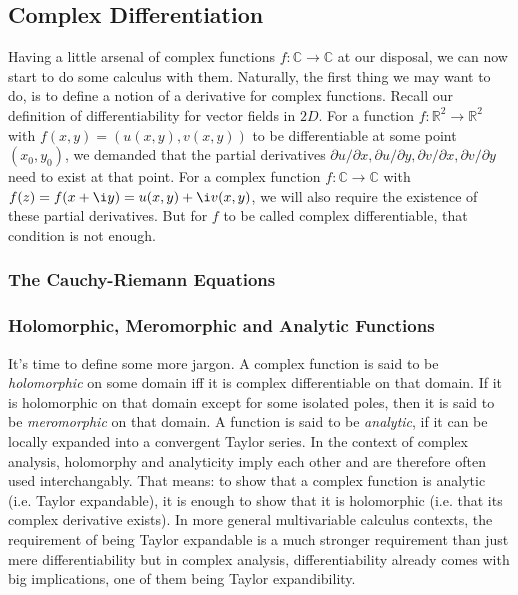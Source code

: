 \subsection{Complex Differentiation}
Having a little arsenal of complex functions $f: \mathbb{C} \rightarrow \mathbb{C}$ at our disposal, we can now start to do some calculus with them. Naturally, the first thing we may want to do, is to define a notion of a derivative for complex functions. Recall our definition of differentiability for vector fields in $2D$. For a function $f: \mathbb{R}^2 \rightarrow \mathbb{R}^2$ with $f(x,y) = (u(x,y), v(x,y))$ to be differentiable at some point $(x_0, y_0)$, we demanded that the partial derivatives $\partial u / \partial x, \partial u / \partial y, \partial v / \partial x, \partial v / \partial y$ need to exist at that point. For a complex function $f: \mathbb{C} \rightarrow \mathbb{C}$ with $f(z) = f(x + \i y) = u(x,y) + \i v(x,y)$, we will also require the existence of these partial derivatives. But for $f$ to be called complex differentiable, that condition is not enough.

\subsubsection{The Cauchy-Riemann Equations}


\subsubsection{Holomorphic, Meromorphic and Analytic Functions}
It's time to define some more jargon. A complex function is said to be \emph{holomorphic} on some domain iff it is complex differentiable on that domain. If it is holomorphic on that domain except for some isolated poles, then it is said to be \emph{meromorphic} on that domain. A function is said to be \emph{analytic}, if it can be locally expanded into a convergent Taylor series. In the context of complex analysis, holomorphy and analyticity imply each other and are therefore often used interchangably. That means: to show that a complex function is analytic (i.e. Taylor expandable), it is enough to show that it is holomorphic (i.e. that its complex derivative exists). In more general multivariable calculus contexts, the requirement of being Taylor expandable is a much stronger requirement than just mere differentiability but in complex analysis, differentiability already comes with big implications, one of them being Taylor expandibility.

